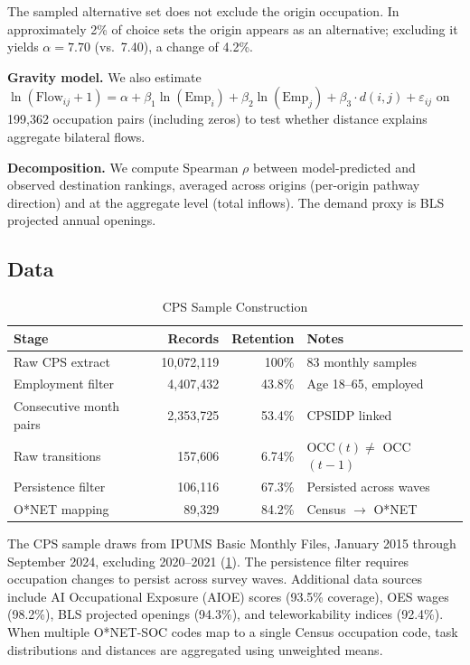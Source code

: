 \documentclass[12pt]{article}
\begin{document}
The sampled alternative set does not exclude the origin occupation. In approximately 2\% of choice sets the origin appears as an alternative; excluding it yields $\alpha = 7.70$ (vs.\ 7.40), a change of 4.2\%.

\textbf{Gravity model.} We also estimate $\ln(\text{Flow}_{ij} + 1) = \alpha + \beta_1 \ln(\text{Emp}_i) + \beta_2 \ln(\text{Emp}_j) + \beta_3 \cdot d(i,j) + \varepsilon_{ij}$ on 199,362 occupation pairs (including zeros) to test whether distance explains aggregate bilateral flows.

\textbf{Decomposition.} We compute Spearman $\rho$ between model-predicted and observed destination rankings, averaged across origins (per-origin pathway direction) and at the aggregate level (total inflows). The demand proxy is BLS projected annual openings.


\subsection{Data}
\label{subsec:external-data}


\begin{table}[h!]
\centering
\caption{CPS Sample Construction}
\label{tab:cps-pipeline}
\begin{tabular}{lrrp{5cm}}
\toprule
\textbf{Stage} & \textbf{Records} & \textbf{Retention} & \textbf{Notes} \\
\midrule
Raw CPS extract & 10,072,119 & 100\% & 83 monthly samples \\
Employment filter & 4,407,432 & 43.8\% & Age 18--65, employed \\
Consecutive month pairs & 2,353,725 & 53.4\% & CPSIDP linked \\
Raw transitions & 157,606 & 6.74\% & OCC$(t) \neq$ OCC$(t-1)$ \\
Persistence filter & 106,116 & 67.3\% & Persisted across waves \\
O*NET mapping & 89,329 & 84.2\% & Census $\to$ O*NET \\
\bottomrule
\end{tabular}
\end{table}

The CPS sample draws from IPUMS Basic Monthly Files, January 2015 through September 2024, excluding 2020--2021 (\cref{tab:cps-pipeline}). The persistence filter requires occupation changes to persist across survey waves. Additional data sources include AI Occupational Exposure (AIOE) scores \citep{FeltenRajSeamans2021} (93.5\% coverage), OES wages (98.2\%), BLS projected openings (94.3\%), and \citet{DingelNeiman2020} teleworkability indices (92.4\%). When multiple O*NET-SOC codes map to a single Census occupation code, task distributions and distances are aggregated using unweighted means.
\end{document}
